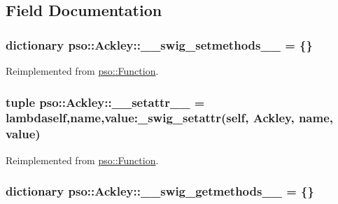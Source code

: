 \subsection{Field Documentation}
\hypertarget{classpso_1_1Ackley_8b601c932da42d58672496d0b982e333}{
\subsubsection{\setlength{\rightskip}{0pt plus 5cm}dictionary {\bf pso::Ackley::\_\-\_\-swig\_\-setmethods\_\-\_\-} = \{\}}}
\label{classpso_1_1Ackley_8b601c932da42d58672496d0b982e333}




Reimplemented from \hyperlink{classpso_1_1Function_2334bfe507115d58047f67960dde71d3}{pso::Function}.\hypertarget{classpso_1_1Ackley_b19008786aca804a23b7fa7744c89c25}{
\subsubsection{\setlength{\rightskip}{0pt plus 5cm}tuple {\bf pso::Ackley::\_\-\_\-setattr\_\-\_\-} = lambdaself,name,value:\_\-swig\_\-setattr(self, {\bf Ackley}, name, value)}}
\label{classpso_1_1Ackley_b19008786aca804a23b7fa7744c89c25}




Reimplemented from \hyperlink{classpso_1_1Function_cd8775cf6aadc3fdf4e6d82158ef10fb}{pso::Function}.\hypertarget{classpso_1_1Ackley_48bbde97c1ea3bf426dceed5fa9ca874}{
\subsubsection{\setlength{\rightskip}{0pt plus 5cm}dictionary {\bf pso::Ackley::\_\-\_\-swig\_\-getmethods\_\-\_\-} = \{\}}}
\label{classpso_1_1Ackley_48bbde97c1ea3bf426dceed5fa9ca874}




